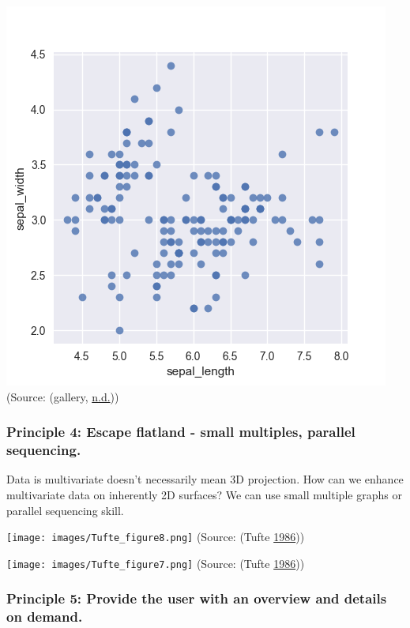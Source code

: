 \documentclass[]{book}
\begin{document}
\includegraphics{images/scatterplot_smalldot.png}
(Source: (gallery, \protect\hyperlink{ref-The_python_graph_gallery_scatter_plot}{n.d.}))

\hypertarget{principle-4-escape-flatland---small-multiples-parallel-sequencing.}{%
\subsubsection{Principle 4: Escape flatland - small multiples, parallel sequencing.}\label{principle-4-escape-flatland---small-multiples-parallel-sequencing.}}

Data is multivariate doesn't necessarily mean 3D projection. How can we enhance multivariate data on inherently 2D surfaces? We can use small multiple graphs or parallel sequencing skill.

\texttt{[image: images/Tufte\_figure8.png]}
(Source: (Tufte \protect\hyperlink{ref-The-Visual-Display-of-Quantitative-Information}{1986}))

\texttt{[image: images/Tufte\_figure7.png]}
(Source: (Tufte \protect\hyperlink{ref-The-Visual-Display-of-Quantitative-Information}{1986}))

\hypertarget{principle-5-provide-the-user-with-an-overview-and-details-on-demand.}{%
\subsubsection{Principle 5: Provide the user with an overview and details on demand.}\label{principle-5-provide-the-user-with-an-overview-and-details-on-demand.}}
\end{document}

